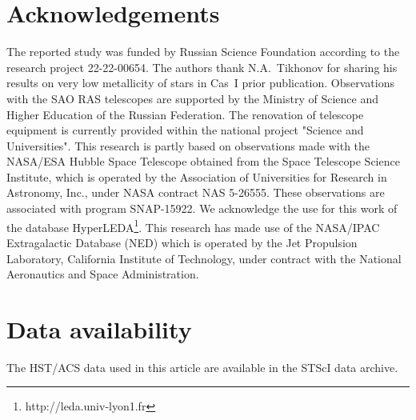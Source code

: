 \documentclass[useAMS,usenatbib]{mn2e}
\begin{document}
\section*{Acknowledgements}
The reported study was funded by Russian Science Foundation according to the
research project  22-22-00654.
The authors thank N.A.~Tikhonov for sharing his results on very low metallicity
of stars in Cas~I  prior publication.
Observations with the SAO RAS telescopes are supported by the Ministry of Science and
Higher Education of the Russian Federation. The renovation of telescope equipment is
currently provided within the national project "Science and Universities".
This research is partly based on observations made with the NASA/ESA Hubble
Space Telescope obtained from the Space Telescope Science Institute,
which is operated by the Association of Universities for Research in
Astronomy, Inc., under NASA contract NAS 5-26555. These observations are associated
with program SNAP-15922.
We acknowledge the use for this work of the database HyperLEDA\footnote{http://leda.univ-lyon1.fr}.
This research has made use of the NASA/IPAC Extragalactic Database (NED)
which is operated by the Jet Propulsion Laboratory, California Institute
of Technology, under contract with the National Aeronautics and Space Administration.

\section*{Data availability}
The HST/ACS data used in this article are available in the
STScI data archive.

\end{document}
